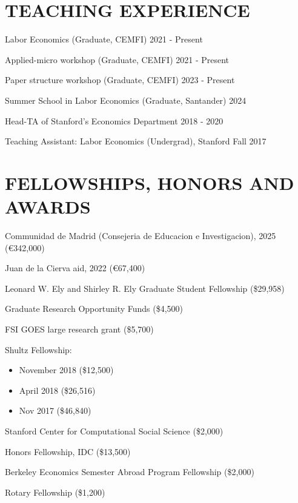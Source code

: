 \documentclass[margin]{res} %
\begin{document}
\begin{resume}
\section{TEACHING EXPERIENCE}

Labor Economics (Graduate, CEMFI) \hfill 2021 - Present

Applied-micro workshop (Graduate, CEMFI) \hfill 2021 - Present

Paper structure workshop (Graduate, CEMFI) \hfill 2023 - Present

Summer School in Labor Economics (Graduate, Santander) \hfill 2024

Head-TA of Stanford's Economics Department \hfill 2018 - 2020

Teaching Assistant: Labor Economics (Undergrad), Stanford \hfill Fall 2017



\section{FELLOWSHIPS, HONORS AND AWARDS}
		
		Communidad de Madrid (Consejeria de Educacion e Investigacion), 2025 (\euro{342,000})

		Juan de la Cierva aid, 2022 (\euro{67,400})

		 Leonard W. Ely and Shirley R. Ely Graduate Student Fellowship (\$29,958)

     Graduate Research Opportunity Funds (\$4,500)

     FSI GOES large research grant (\$5,700)

     Shultz Fellowship:
     \begin{itemize}
     	\item November 2018 (\$12,500)
     	\item April 2018 (\$26,516)
     	\item Nov 2017 (\$46,840)
     \end{itemize}

		 Stanford Center for Computational Social Science (\$2,000) 

		 Honors Fellowship, IDC (\$13,500) 

		 Berkeley Economics Semester Abroad Program Fellowship (\$2,000) 

		 Rotary Fellowship (\$1,200) 



\end{resume}
\end{document}
